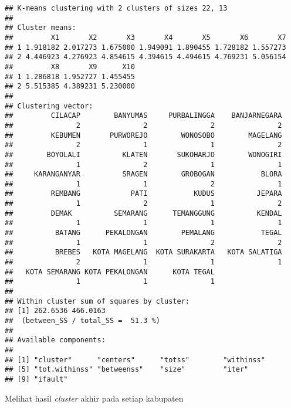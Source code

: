 \documentclass[
]{elegantbook}
\newenvironment{Shaded}{\begin{snugshade}}{\end{snugshade}}
\newcommand{\CommentTok}[1]{\textcolor[rgb]{0.56,0.35,0.01}{\textit{#1}}}
\newcommand{\NormalTok}[1]{#1}
\newcommand{\SpecialCharTok}[1]{\textcolor[rgb]{0.81,0.36,0.00}{\textbf{#1}}}
\begin{document}
\begin{verbatim}
## K-means clustering with 2 clusters of sizes 22, 13
## 
## Cluster means:
##         X1       X2       X3       X4       X5       X6       X7
## 1 1.918182 2.017273 1.675000 1.949091 1.890455 1.728182 1.557273
## 2 4.446923 4.276923 4.854615 4.394615 4.494615 4.769231 5.056154
##         X8       X9      X10
## 1 1.286818 1.952727 1.455455
## 2 5.515385 4.389231 5.230000
## 
## Clustering vector:
##         CILACAP        BANYUMAS     PURBALINGGA    BANJARNEGARA 
##               2               2               2               2 
##         KEBUMEN       PURWOREJO        WONOSOBO        MAGELANG 
##               2               1               1               2 
##        BOYOLALI          KLATEN       SUKOHARJO        WONOGIRI 
##               1               2               1               1 
##     KARANGANYAR          SRAGEN        GROBOGAN           BLORA 
##               1               1               2               1 
##         REMBANG            PATI           KUDUS          JEPARA 
##               1               2               1               2 
##         DEMAK          SEMARANG      TEMANGGUNG          KENDAL 
##               1               1               1               1 
##          BATANG      PEKALONGAN        PEMALANG           TEGAL 
##               1               1               2               2 
##          BREBES   KOTA MAGELANG  KOTA SURAKARTA   KOTA SALATIGA 
##               2               1               1               1 
##   KOTA SEMARANG KOTA PEKALONGAN      KOTA TEGAL 
##               1               1               1 
## 
## Within cluster sum of squares by cluster:
## [1] 262.6536 466.0163
##  (between_SS / total_SS =  51.3 %)
## 
## Available components:
## 
## [1] "cluster"      "centers"      "totss"        "withinss"    
## [5] "tot.withinss" "betweenss"    "size"         "iter"        
## [9] "ifault"
\end{verbatim}

Melihat hasil \emph{cluster} akhir pada setiap kabupaten

\begin{Shaded}
\end{Shaded}
\end{document}
